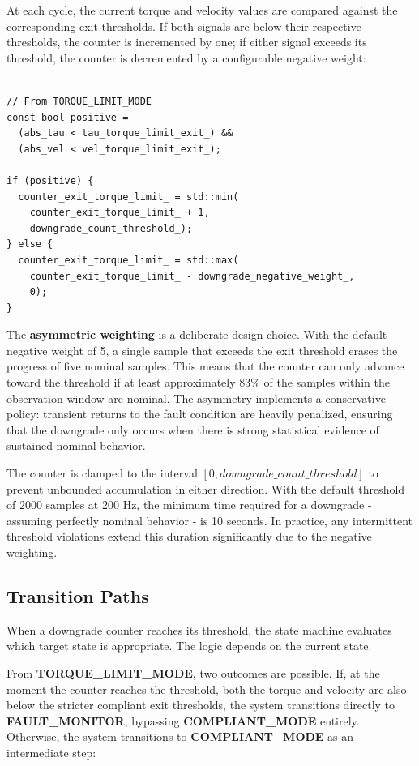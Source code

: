 At each cycle, the current torque and velocity values are compared against the corresponding exit thresholds. If both signals are below their respective thresholds, the counter is incremented by one; if either signal exceeds its threshold, the counter is decremented by a configurable negative weight:

\begin{verbatim}

// From TORQUE_LIMIT_MODE
const bool positive =
  (abs_tau < tau_torque_limit_exit_) &&
  (abs_vel < vel_torque_limit_exit_);

if (positive) {
  counter_exit_torque_limit_ = std::min(
    counter_exit_torque_limit_ + 1,
    downgrade_count_threshold_);
} else {
  counter_exit_torque_limit_ = std::max(
    counter_exit_torque_limit_ - downgrade_negative_weight_,
    0);
}

\end{verbatim}

The \textbf{asymmetric weighting} is a deliberate design choice. With the default negative weight of 5, a single sample that exceeds the exit threshold erases the progress of five nominal samples. This means that the counter can only advance toward the threshold if at least approximately 83\% of the samples within the observation window are nominal. The asymmetry implements a conservative policy: transient returns to the fault condition are heavily penalized, ensuring that the downgrade only occurs when there is strong statistical evidence of sustained nominal behavior.

The counter is clamped to the interval $[0, downgrade\_count\_threshold]$ to prevent unbounded accumulation in either direction. With the default threshold of 2000 samples at 200 Hz, the minimum time required for a downgrade - assuming perfectly nominal behavior - is 10 seconds. In practice, any intermittent threshold violations extend this duration significantly due to the negative weighting.

\subsection{Transition Paths}
When a downgrade counter reaches its threshold, the state machine evaluates which target state is appropriate. The logic depends on the current state.

From \textbf{TORQUE\_LIMIT\_MODE}, two outcomes are possible. If, at the moment the counter reaches the threshold, both the torque and velocity are also below the stricter compliant exit thresholds, the system transitions directly to \textbf{FAULT\_MONITOR}, bypassing \textbf{COMPLIANT\_MODE} entirely. Otherwise, the system transitions to \textbf{COMPLIANT\_MODE} as an intermediate step:

